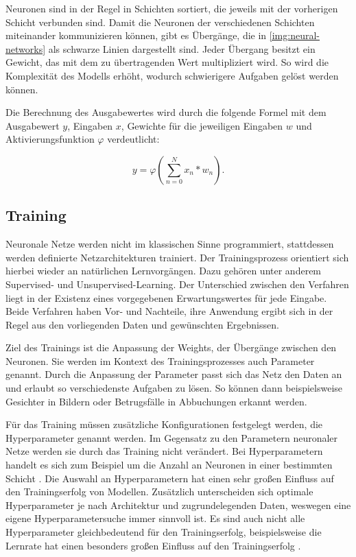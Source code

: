 Neuronen sind in der Regel in Schichten sortiert, die jeweils mit der vorherigen Schicht verbunden sind.
Damit die Neuronen der verschiedenen Schichten miteinander kommunizieren können, gibt es Übergänge, die in \cref{img:neural-networks} als schwarze Linien dargestellt sind.
Jeder Übergang besitzt ein Gewicht, das mit dem zu übertragenden Wert multipliziert wird.
So wird die Komplexität des Modells erhöht, wodurch schwierigere Aufgaben gelöst werden können.
\newline

Die Berechnung des Ausgabewertes wird durch die folgende Formel mit dem Ausgabewert $y$, Eingaben $x$, Gewichte für die jeweiligen Eingaben $w$ und Aktivierungsfunktion $\varphi$ verdeutlicht:

\begin{equation}
	y = \varphi ( \sum_{n=0}^N x_n * w_n).
\end{equation}

\subsection{Training}
Neuronale Netze werden nicht im klassischen Sinne programmiert, stattdessen werden definierte Netzarchitekturen trainiert.
Der Trainingsprozess orientiert sich hierbei wieder an natürlichen Lernvorgängen.
Dazu gehören unter anderem Supervised- und Unsupervised-Learning.
Der Unterschied zwischen den Verfahren liegt in der Existenz eines vorgegebenen Erwartungswertes für jede Eingabe.
Beide Verfahren haben Vor- und Nachteile, ihre Anwendung ergibt sich in der Regel aus den vorliegenden Daten und gewünschten Ergebnissen.

Ziel des Trainings ist die Anpassung der Weights, der Übergänge zwischen den Neuronen.
Sie werden im Kontext des Trainingsprozesses auch Parameter genannt.
Durch die Anpassung der Parameter passt sich das Netz den Daten an und erlaubt so verschiedenste Aufgaben zu lösen.
So können dann beispielsweise Gesichter in Bildern oder Betrugsfälle in Abbuchungen erkannt werden.
\newline

Für das Training müssen zusätzliche Konfigurationen festgelegt werden, die Hyperparameter genannt werden.
Im Gegensatz zu den Parametern neuronaler Netze werden sie durch das Training nicht verändert.
Bei Hyperparametern handelt es sich zum Beispiel um die Anzahl an Neuronen in einer bestimmten Schicht \cite{hyperparameters-gan-using-genetic-algorithm}.
Die Auswahl an Hyperparametern hat einen sehr großen Einfluss auf den Trainingserfolg von Modellen.
Zusätzlich unterscheiden sich optimale Hyperparameter je nach Architektur und zugrundelegenden Daten, weswegen eine eigene Hyperparametersuche immer sinnvoll ist.
Es sind auch nicht alle Hyperparameter gleichbedeutend für den Trainingserfolg, beispielsweise die Lernrate hat einen besonders großen Einfluss auf den Trainingserfolg \cite{learning-rate-most-important}.

